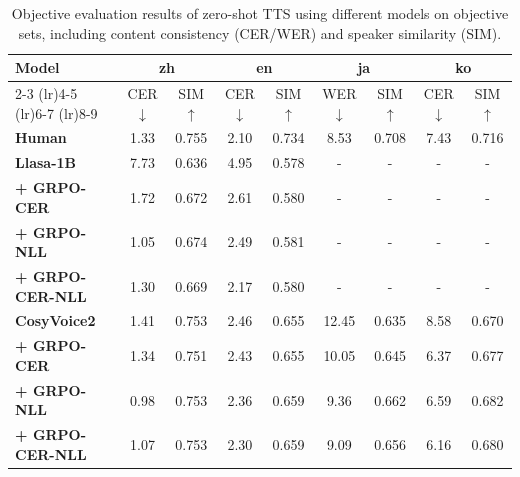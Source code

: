 \documentclass{article}
\begin{document}
\begin{table}[t]
	\centering
	\caption{Objective evaluation results of zero-shot TTS using different models on objective sets, including content consistency (CER/WER) and speaker similarity (SIM).}
	\renewcommand\arraystretch{0.8}
     \footnotesize
	\label{tab:zs-obj}
	\begin{tabular}{lcccccccc}
        \toprule
        \multirow{2}{*}[-1.3ex]{Model} & \multicolumn{2}{c}{zh} &  \multicolumn{2}{c}{en} & \multicolumn{2}{c}{ja} & \multicolumn{2}{c}{ko} \\
        \cmidrule(lr){2-3} \cmidrule(lr){4-5} \cmidrule(lr){6-7} \cmidrule(lr){8-9}
        & CER $\downarrow$ & SIM $\uparrow$ & CER $\downarrow$ & SIM $\uparrow$ & WER $\downarrow$ & SIM $\uparrow$ & CER $\downarrow$ & SIM $\uparrow$ \\
        \midrule
        \textbf{Human} & 1.33 & 0.755 & 2.10 & 0.734 & 8.53 & 0.708 & 7.43 & 0.716  \\
        \midrule
        \textbf{Llasa-1B} & 7.73 & 0.636 & 4.95 & 0.578 & - & - & - & - \\
        \textbf{+ GRPO-CER} & 1.72 & 0.672  & 2.61 & 0.580 & - & - & - & - \\
        \textbf{+ GRPO-NLL} & 1.05 & 0.674  & 2.49 & 0.581 & - & - & - & - \\
        \textbf{+ GRPO-CER-NLL} & 1.30 & 0.669  & 2.17 & 0.580 & - & - & - & - \\
        \midrule
        \textbf{CosyVoice2} & 1.41 & 0.753 & 2.46 & 0.655 & 12.45 & 0.635 & 8.58 & 0.670 \\
        \textbf{+ GRPO-CER} & 1.34 & 0.751  & 2.43 & 0.655 & 10.05 & 0.645 & 6.37 & 0.677 \\
        \textbf{+ GRPO-NLL} & 0.98 & 0.753  & 2.36 & 0.659 & 9.36 & 0.662 & 6.59 & 0.682 \\
        \textbf{+ GRPO-CER-NLL} & 1.07 & 0.753  & 2.30 & 0.659 & 9.09 & 0.656 & 6.16 & 0.680 \\
        \bottomrule
    \end{tabular}
		\vspace{-0.6cm}
\end{table}
\end{document}
